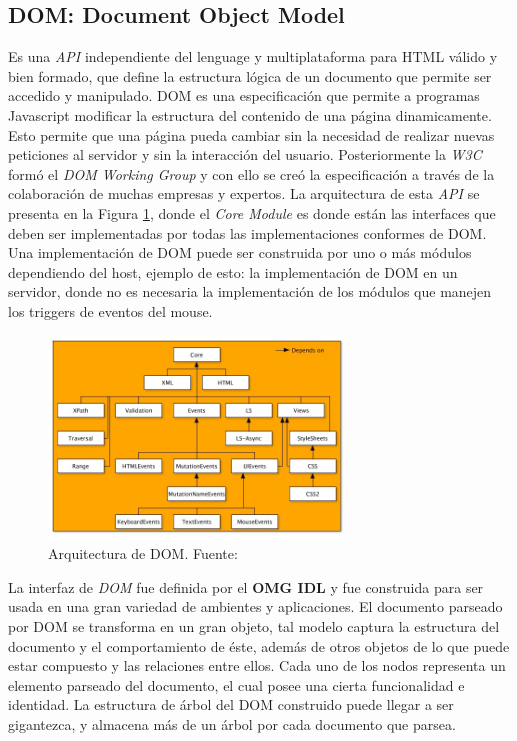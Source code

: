     \subsection{DOM: Document Object Model}
    \label{chap2:DOM}
    Es una \textit{API} independiente del lenguage y multiplataforma para HTML válido y bien formado, que define la estructura lógica de un documento que permite ser accedido y manipulado. DOM es una especificación que permite a programas Javascript modificar la estructura del contenido de una página dinamicamente. Esto permite que una página pueda cambiar sin la necesidad de realizar nuevas peticiones al servidor y sin la interacción del usuario. Posteriormente la \textit{W3C} \cite{w3c} formó el \textit{DOM Working Group} y con ello se creó la especificación a través de la colaboración de muchas empresas y expertos. La arquitectura de esta \textit{API} se presenta en la Figura \ref{fig:DOM}, donde el \textit{Core Module} es donde están las interfaces que deben ser implementadas por todas las implementaciones conformes de DOM. Una implementación de DOM puede ser construida por uno o más módulos dependiendo del host, ejemplo de esto: la implementación de DOM en un servidor, donde no es necesaria la implementación de los módulos que manejen los triggers de eventos del mouse.
            
    \begin{figure}[h!t]
            \centering
        \includegraphics[width=0.7\textwidth]{figures/dom-architecture.jpg}
        \caption{Arquitectura de DOM. Fuente: \cite{w3c}}
        \label{fig:DOM}
    \end{figure}
            
    La interfaz de \textit{DOM} fue definida por el \textbf{OMG IDL} y fue construida para ser usada en una gran variedad de ambientes y aplicaciones. El documento parseado por DOM se transforma en un gran objeto, tal modelo captura la estructura del documento y el comportamiento de éste, además de otros objetos de lo que puede estar compuesto y las relaciones entre ellos. Cada uno de los nodos representa un elemento parseado del documento, el cual posee una cierta funcionalidad e identidad. La estructura de árbol del DOM construido puede llegar a ser gigantezca, y almacena más de un árbol por cada documento que parsea. 
            
